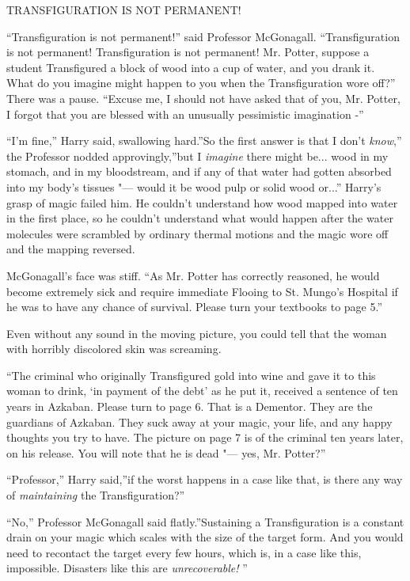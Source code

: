 TRANSFIGURATION IS NOT PERMANENT!

``Transfiguration is not permanent!'' said Professor McGonagall.
``Transfiguration is not permanent! Transfiguration is not permanent!
Mr. Potter, suppose a student Transfigured a block of wood into a cup of
water, and you drank it. What do you imagine might happen to you when
the Transfiguration wore off?'' There was a pause. ``Excuse me, I should
not have asked that of you, Mr. Potter, I forgot that you are blessed
with an unusually pessimistic imagination -''

``I'm fine,'' Harry said, swallowing hard.''So the first answer is that
I don't \emph{know},'' the Professor nodded approvingly,''but I
\emph{imagine} there might be... wood in my stomach, and in my
bloodstream, and if any of that water had gotten absorbed into my body's
tissues "--- would it be wood pulp or solid wood or...'' Harry's grasp
of magic failed him. He couldn't understand how wood mapped into water
in the first place, so he couldn't understand what would happen after
the water molecules were scrambled by ordinary thermal motions and the
magic wore off and the mapping reversed.

McGonagall's face was stiff. ``As Mr. Potter has correctly reasoned, he
would become extremely sick and require immediate Flooing to St. Mungo's
Hospital if he was to have any chance of survival. Please turn your
textbooks to page 5.''

Even without any sound in the moving picture, you could tell that the
woman with horribly discolored skin was screaming.

``The criminal who originally Transfigured gold into wine and gave it to
this woman to drink, `in payment of the debt' as he put it, received a
sentence of ten years in Azkaban. Please turn to page 6. That is a
Dementor. They are the guardians of Azkaban. They suck away at your
magic, your life, and any happy thoughts you try to have. The picture on
page 7 is of the criminal ten years later, on his release. You will note
that he is dead "--- yes, Mr. Potter?''

``Professor,'' Harry said,''if the worst happens in a case like that, is
there any way of \emph{maintaining} the Transfiguration?''

``No,'' Professor McGonagall said flatly.''Sustaining a Transfiguration
is a constant drain on your magic which scales with the size of the
target form. And you would need to recontact the target every few hours,
which is, in a case like this, impossible. Disasters like this are
\emph{unrecoverable!} ''

